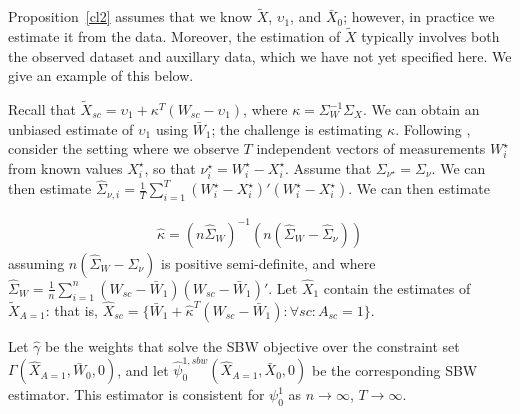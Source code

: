Proposition~\ref{cl2} assumes that we know $\tilde{X}$, $\upsilon_1$, and $\bar{X}_0$; however, in practice we estimate it from the data. Moreover, the estimation of $\tilde{X}$ typically involves both the observed dataset and auxillary data, which we have not yet specified here. We give an example of this below.

Recall that $\tilde{X}_{sc} = \upsilon_1 + \kappa^T(W_{sc} - \upsilon_1)$, where $\kappa = \Sigma_W^{-1}\Sigma_X$. We can obtain an unbiased estimate of $\upsilon_1$ using $\bar{W}_1$; the challenge is estimating $\kappa$. Following \cite{gleser1992importance}, consider the setting where we observe $T$ independent vectors of measurements $W_i^\star$ from known values $X_i^\star$, so that $\nu_i^\star = W_i^\star - X_i^\star$. Assume that $\Sigma_{\nu^\star} = \Sigma_{\nu}$. We can then estimate $\hat{\Sigma}_{\nu, i} = \frac{1}{T}\sum_{i=1}^T(W_i^\star - X_i^\star)'(W_i^\star - X_i^\star)$. We can then estimate

\begin{align*}
\hat{\kappa} = (n\hat{\Sigma}_W)^{-1}(n(\hat{\Sigma}_W - \hat{\Sigma}_{\nu}))
\end{align*}
%
assuming $n(\hat{\Sigma}_W - \hat{\Sigma}_{\nu})$ is positive semi-definite, and where $\hat{\Sigma}_W = \frac{1}{n}\sum_{i=1}^n (W_{sc} - \bar{W}_1)(W_{sc} - \bar{W}_1)'$. Let $\hat{X}_1$ contain the estimates of $\tilde{X}_{A=1}$: that is, $\hat{X}_{sc} = \{\bar{W}_1 + \hat{\kappa}^T(W_{sc} - \bar{W}_1): \forall sc: A_{sc} = 1\}$. 

\begin{proposition}\label{cl3}
Let $\hat{\gamma}$ be the weights that solve the SBW objective over the constraint set $\Gamma(\hat{X}_{A=1}, \bar{W}_0, 0)$, and let $\hat{\psi}^{1, sbw}_0(\hat{X}_{A=1}, \bar{X}_0, 0)$ be the corresponding SBW estimator. This estimator is consistent for $\psi_0^1$ as $n \to \infty$, $T \to \infty$.
\end{proposition}

